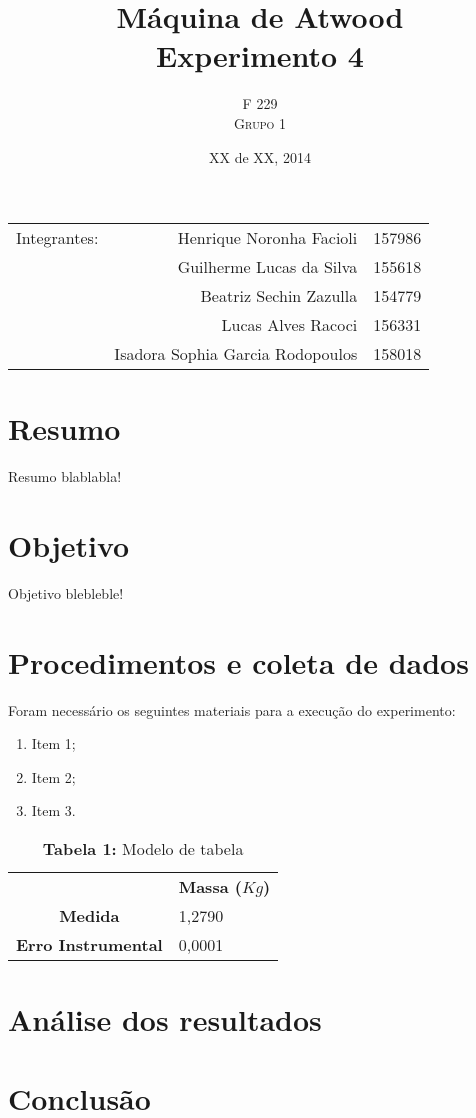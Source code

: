 \documentclass{article}
\title{Máquina de Atwood \\ Experimento 4} %
\author{F 229 \\ \textsc{Grupo 1}}
\date{XX de XX, 2014}
\begin{document}
\maketitle

\begin{center}
	\begin{tabular}{l r l}
		Integrantes: & Henrique Noronha Facioli & 157986 \\
		& Guilherme Lucas da Silva & 155618 \\
		& Beatriz Sechin Zazulla & 154779 \\
		& Lucas Alves Racoci & 156331 \\
		& Isadora Sophia Garcia Rodopoulos & 158018 \\
	\end{tabular}
\end{center}


\section{Resumo}
Resumo blablabla!


\section{Objetivo}
Objetivo blebleble!


\section{Procedimentos e coleta de dados}

Foram necessário os seguintes materiais para a execução do experimento:
\begin{enumerate} 
	\item Item 1;
	\item Item 2;
	\item Item 3.
 \end {enumerate} 

\begin{table}[!ht]
	\begin{center}
		\caption*{\textbf{Tabela 1:} Modelo de tabela}
		\begin{tabular}{| l | l |}
			\cline{2-2} \multicolumn{0}{c|}{ } & \multicolumn{1}{c|}{\textbf{Massa ($Kg$)}} \\  \cline{1-2}
			\multicolumn{0}{|c|}{\textbf{Medida}} & 1,2790\\ \hline
			\multicolumn{0}{|c|}{\textbf{Erro Instrumental}} & 0,0001\\ \hline
		\end{tabular}
	\end{center}
\end{table}

\section{Análise dos resultados}

\section{Conclusão}
\end{document}
